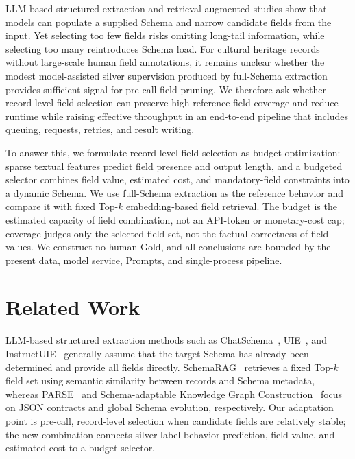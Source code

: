 \documentclass[runningheads]{llncs}
\newcommand{\schemarag}{SchemaRAG}
\begin{document}
LLM-based structured extraction and retrieval-augmented studies show that models can populate a supplied Schema and narrow candidate fields from the input. Yet selecting too few fields risks omitting long-tail information, while selecting too many reintroduces Schema load. For cultural heritage records without large-scale human field annotations, it remains unclear whether the modest model-assisted silver supervision produced by full-Schema extraction provides sufficient signal for pre-call field pruning. We therefore ask whether record-level field selection can preserve high reference-field coverage and reduce runtime while raising effective throughput in an end-to-end pipeline that includes queuing, requests, retries, and result writing.

To answer this, we formulate record-level field selection as budget optimization: sparse textual features predict field presence and output length, and a budgeted selector combines field value, estimated cost, and mandatory-field constraints into a dynamic Schema. We use full-Schema extraction as the reference behavior and compare it with fixed Top-$k$ embedding-based field retrieval. The budget is the estimated capacity of field combination, not an API-token or monetary-cost cap; coverage judges only the selected field set, not the factual correctness of field values. We construct no human Gold, and all conclusions are bounded by the present data, model service, Prompts, and single-process pipeline.

\section{Related Work}

LLM-based structured extraction methods such as ChatSchema~\cite{chatschema}, UIE~\cite{uie}, and InstructUIE~\cite{instructuie} generally assume that the target Schema has already been determined and provide all fields directly. \schemarag{}~\cite{schemarag} retrieves a fixed Top-$k$ field set using semantic similarity between records and Schema metadata, whereas PARSE~\cite{parse} and Schema-adaptable Knowledge Graph Construction~\cite{adakgc} focus on JSON contracts and global Schema evolution, respectively. Our adaptation point is pre-call, record-level selection when candidate fields are relatively stable; the new combination connects silver-label behavior prediction, field value, and estimated cost to a budget selector.
\end{document}
